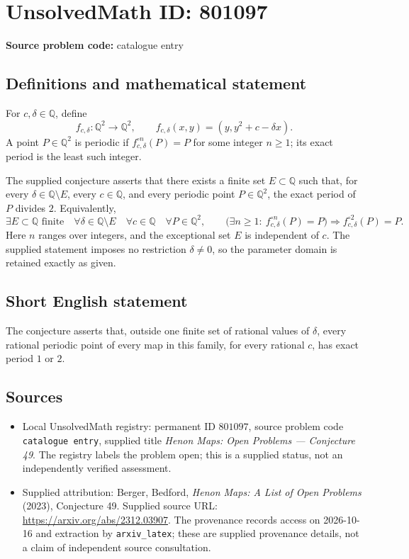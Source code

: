 \documentclass[11pt]{article}
\newcommand{\Q}{\mathbb{Q}}
\begin{document}
\section*{UnsolvedMath ID: 801097}
\textbf{Source problem code:} catalogue entry
\subsection{Definitions and mathematical statement}
For \(c,\delta\in\Q\), define
\[
f_{c,\delta}\colon\Q^2\longrightarrow\Q^2,\qquad f_{c,\delta}(x,y)=(y,y^2+c-\delta x).
\]
A point \(P\in\Q^2\) is periodic if \(f_{c,\delta}^{\circ n}(P)=P\) for some integer \(n\geq1\); its exact period is the least such integer.

The supplied conjecture asserts that there exists a finite set \(E\subset\Q\) such that, for every \(\delta\in\Q\setminus E\), every \(c\in\Q\), and every periodic point \(P\in\Q^2\), the exact period of \(P\) divides \(2\). Equivalently,
\[
\exists E\subset\Q\text{ finite}\quad
\forall\delta\in\Q\setminus E\quad
\forall c\in\Q\quad
\forall P\in\Q^2,\qquad
\bigl(\exists n\geq1:\ f_{c,\delta}^{\circ n}(P)=P\bigr)
\Longrightarrow f_{c,\delta}^{\circ2}(P)=P.
\]
Here \(n\) ranges over integers, and the exceptional set \(E\) is independent of \(c\). The supplied statement imposes no restriction \(\delta\neq0\), so the parameter domain is retained exactly as given.
\subsection{Short English statement}
The conjecture asserts that, outside one finite set of rational values of \(\delta\), every rational periodic point of every map in this family, for every rational \(c\), has exact period \(1\) or \(2\).
\subsection{Sources}
\begin{itemize}
\item Local UnsolvedMath registry: permanent ID \(801097\), source problem code \texttt{catalogue entry}, supplied title \emph{Henon Maps: Open Problems --- Conjecture 49}. The registry labels the problem open; this is a supplied status, not an independently verified assessment.
\item Supplied attribution: Berger, Bedford, \emph{Henon Maps: A List of Open Problems} (2023), Conjecture 49. Supplied source URL: \url{https://arxiv.org/abs/2312.03907}. The provenance records access on 2026-10-16 and extraction by \texttt{arxiv\_latex}; these are supplied provenance details, not a claim of independent source consultation.
\end{itemize}
\end{document}
